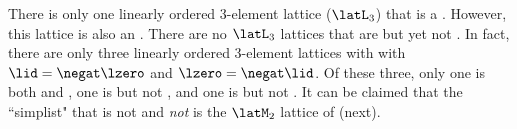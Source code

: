 %
%

\begin{remark}
There is only one linearly ordered  3-element lattice ($\latL_3$) that is a  .
However, this lattice is also an .
There are no $\latL_3$ lattices that are  but yet not .
In fact, there are only three linearly ordered 3-element lattices with with $\lid=\negat\lzero$ and $\lzero=\negat\lid$.
Of these three, only one is both  and  ,
one is  but not  , 
and one is  but not  .
It can be claimed that the ``simplist"  that is not  and 
\emph{not}  is the $\latM_2$ lattice of  (next).
\end{remark}

